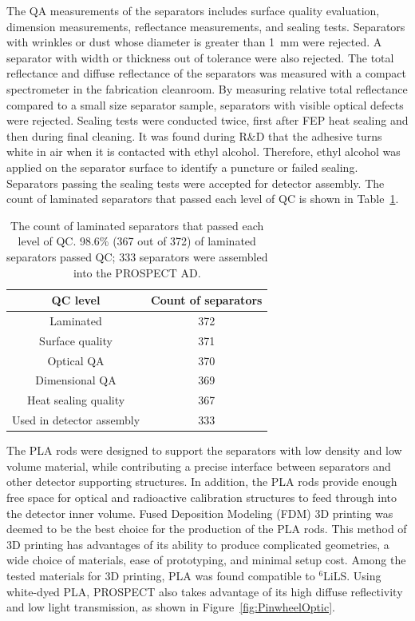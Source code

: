 The QA measurements of the separators includes surface quality evaluation, dimension measurements, reflectance measurements, and sealing tests.
Separators with wrinkles or dust whose diameter is greater than 1~mm were rejected.
A separator with width or thickness out of tolerance were also rejected. 
The total reflectance and diffuse reflectance of the separators was measured with a compact spectrometer in the fabrication cleanroom.
By measuring relative total reflectance compared to a small size separator sample, separators with visible optical defects were rejected.
Sealing tests were conducted twice, first after FEP heat sealing and then during final cleaning.
It was found during R\&D that the adhesive turns white in air when it is contacted with ethyl alcohol. 
Therefore, ethyl alcohol was applied on the separator surface to identify a puncture or failed sealing.
Separators passing the sealing tests were accepted for detector assembly.
The count of laminated separators that passed each level of QC is shown in Table~\ref{tab:separatorQA}.

\begin{table}[h!]
\centering
\caption[The count of fabricated separators passing each level of QC]{The count of laminated separators that passed each level of QC. 
98.6\% (367 out of 372) of laminated separators passed QC; 333 separators were assembled into the PROSPECT AD.}
\begin{tabular}{cc}
\hline 
\hline
QC level & Count of separators\\
\hline
Laminated & 372 \\
Surface quality & 371 \\
Optical QA & 370 \\
Dimensional QA & 369 \\
Heat sealing quality & 367 \\
Used in detector assembly & 333\\
\hline
\end{tabular}
\label{tab:separatorQA}
\end{table}


The PLA rods were designed to support the separators with low density and low volume material, while contributing a precise interface between separators and other detector supporting structures.
In addition, the PLA rods provide enough free space for optical and radioactive calibration structures to feed through into the detector inner volume.
Fused Deposition Modeling (FDM) 3D printing was deemed to be the best choice for the production of the PLA rods.  This method of 3D printing has advantages of its ability to produce complicated geometries, a wide choice of materials, ease of prototyping, and minimal setup cost.
Among the tested materials for 3D printing, PLA was found compatible to $^6$LiLS.
Using white-dyed PLA, PROSPECT also takes advantage of its high diffuse reflectivity and low light transmission, as shown in Figure~\ref{fig:PinwheelOptic}.

